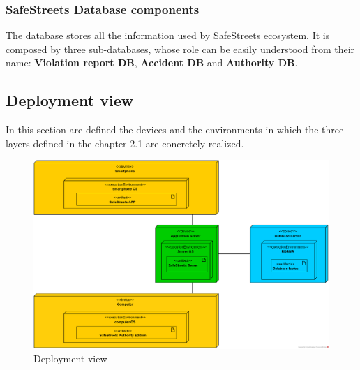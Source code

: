 \documentclass{article}
\begin{document}
		\subsubsection{SafeStreets Database components}
		The database stores all the information used by SafeStreets ecosystem. It is composed by three sub-databases, whose role can be easily understood from their name: \textbf{Violation report DB}, \textbf{Accident DB} and \textbf{Authority DB}.
		
		\subsection{Deployment view}
		In this section are defined the devices and the environments in which the three layers defined in the chapter 2.1 are concretely realized.
		
		\begin{figure}[H]
			\includegraphics [scale=0.5] {diagrams/deployment_view.png}
			\caption[Deployment View]{Deployment view}
			\label{fig:deployment_view}
		\end{figure}
	
\end{document}
